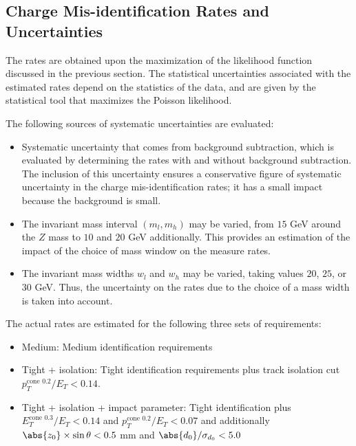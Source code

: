 \subsection{Charge Mis-identification Rates and Uncertainties}

The rates are obtained upon the maximization of the likelihood function
discussed in the previous section. The statistical uncertainties associated
with the estimated rates depend on the statistics of the data, and are given by
the statistical tool that maximizes the Poisson likelihood.

\vspace{3mm}

The following sources of systematic uncertainties are evaluated:

\begin{itemize}


	\item Systematic uncertainty that comes from background subtraction, which is
	      evaluated by determining the rates with and without background subtraction. The
	      inclusion of this uncertainty ensures a conservative figure of systematic
	      uncertainty in the charge mis-identification rates; it has a small impact
	      because the background is small.


\item The invariant mass interval $(m_l,m_h)$ may be varied, from $15$ GeV
around the $Z$ mass to $10$ and $20$ GeV additionally. This provides an
estimation of the impact of the choice of mass window on the measure rates.


	\item The invariant mass widths $w_l$ and $w_h$ may be varied, taking values
	      $20$, $25$, or $30$ GeV. Thus, the uncertainty on the rates
	      due to the choice of a mass width is taken into account. 

\end{itemize}

The actual rates are estimated for the following three sets of requirements:

\begin{itemize}
	\item Medium: Medium identification requirements

	\item Tight + isolation: Tight identification requirements plus track isolation
	      cut $p_T^{\text{cone 0.2}} / E_T < 0.14$.

	\item Tight + isolation + impact parameter: Tight identification plus
	      $E_T^{\text{cone 0.3}} / E_T < 0.14$ and $p_T^{\text{cone 0.2}} / E_T < 0.07$
	      and additionally $\abs{z_0}\times \sin\theta < 0.5$ mm and
	      $\abs{d_0}/\sigma_{d_0} < 5.0$


\end{itemize}

